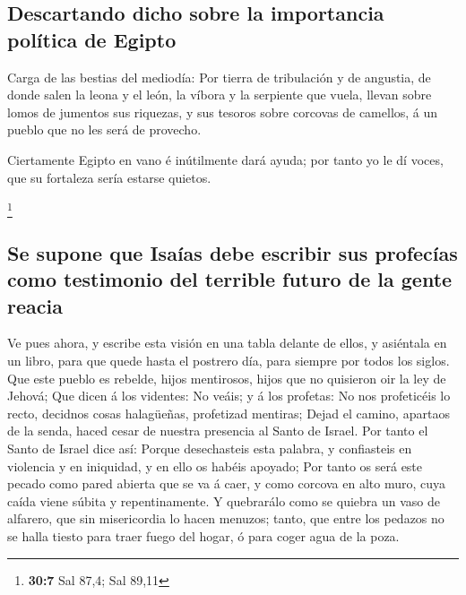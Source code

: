 \hypertarget{descartando-dicho-sobre-la-importancia-poluxedtica-de-egipto}{%
\subsection{Descartando dicho sobre la importancia política de
Egipto}\label{descartando-dicho-sobre-la-importancia-poluxedtica-de-egipto}}

 Carga de las bestias del mediodía: Por tierra de
tribulación y de angustia, de donde salen la leona y el león, la víbora
y la serpiente que vuela, llevan sobre lomos de jumentos sus riquezas, y
sus tesoros sobre corcovas de camellos, á un pueblo que no les será de
provecho.

 Ciertamente Egipto en vano é inútilmente dará ayuda; por
tanto yo le dí voces, que su fortaleza sería estarse quietos.

\footnote{\textbf{30:7} Sal 87,4; Sal 89,11}

\hypertarget{se-supone-que-isauxedas-debe-escribir-sus-profecuxedas-como-testimonio-del-terrible-futuro-de-la-gente-reacia}{%
\subsection{Se supone que Isaías debe escribir sus profecías como
testimonio del terrible futuro de la gente
reacia}\label{se-supone-que-isauxedas-debe-escribir-sus-profecuxedas-como-testimonio-del-terrible-futuro-de-la-gente-reacia}}

 Ve pues ahora, y escribe esta visión en una tabla delante
de ellos, y asiéntala en un libro, para que quede hasta el postrero día,
para siempre por todos los siglos.  Que este pueblo es
rebelde, hijos mentirosos, hijos que no quisieron oir la ley de Jehová;
 Que dicen á los videntes: No veáis; y á los profetas: No
nos profeticéis lo recto, decidnos cosas halagüeñas, profetizad
mentiras;  Dejad el camino, apartaos de la senda, haced
cesar de nuestra presencia al Santo de Israel.  Por tanto
el Santo de Israel dice así: Porque desechasteis esta palabra, y
confiasteis en violencia y en iniquidad, y en ello os habéis apoyado;
 Por tanto os será este pecado como pared abierta que se
va á caer, y como corcova en alto muro, cuya caída viene súbita y
repentinamente.  Y quebrarálo como se quiebra un vaso de
alfarero, que sin misericordia lo hacen menuzos; tanto, que entre los
pedazos no se halla tiesto para traer fuego del hogar, ó para coger agua
de la poza.

